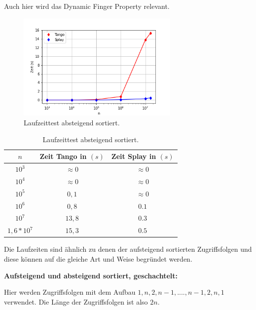\documentclass[a4paper,12pt]{article}
\begin{document}
\bigskip


\noindent Auch hier wird das Dynamic Finger Property relevant. 
\begin{figure}[H]
	\centering
	\includegraphics[width=0.7\textwidth]{Medien/laufzeittest/diagramm/sorted2}
	\caption{Laufzeittest absteigend sortiert.}
\end{figure}
\begin{table}[H]
	\begin{center}
		\begin{tabular}[c]{|c|c|c|}
			\hline
		$n$ & Zeit Tango in $\left(s\right)$ &Zeit Splay in $\left(s\right)$ \\
		\hline
		$10^3$ & $\approx 0$ &$\approx 0$ \\
		\hline
		$10^4$  & $\approx 0$ &$\approx 0$  \\
		\hline
		$10^5$  & $0,1$ &$\approx 0$  \\
		\hline
		$10^6$  & $0,8$ &$0.1$  \\
		\hline
		$10^7$  & $13,8$ &$0.3$  \\
		\hline
		$1,6 *10^7$  & $15,3$ &$0.5$  \\
		\hline
		\end{tabular}
		\caption{Laufzeittest absteigend sortiert.} 
	\end{center}
\end{table}
\noindent Die Laufzeiten sind ähnlich zu denen der aufsteigend sortierten Zugriffsfolgen und diese können auf die gleiche Art und Weise begründet werden.

 \bigskip
\noindent \textbf{Aufsteigend und absteigend sortiert, geschachtelt:}

\bigskip
\noindent Hier werden Zugriffsfolgen mit dem Aufbau $1, n, 2, n- 1,...., n - 1, 2, n, 1$ verwendet. Die Länge der Zugriffsfolgen ist also $2n$.
\end{document}
